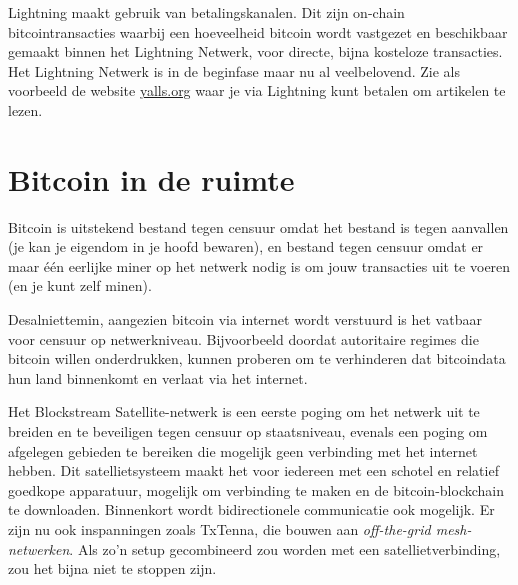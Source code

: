 Lightning maakt gebruik van betalingskanalen. Dit zijn on-chain bitcointransacties waarbij een hoeveelheid bitcoin wordt vastgezet en beschikbaar gemaakt binnen het Lightning Netwerk, voor directe, bijna kosteloze transacties. Het Lightning Netwerk is in de beginfase maar nu al veelbelovend. Zie als voorbeeld de website \href{https://yalls.org}{yalls.org} waar je via Lightning kunt betalen om artikelen te lezen.  

\section{Bitcoin in de ruimte}

Bitcoin is uitstekend bestand tegen censuur omdat het bestand is tegen aanvallen (je kan je eigendom in je hoofd bewaren), en bestand tegen censuur omdat er maar één eerlijke miner op het netwerk nodig is om jouw transacties uit te voeren (en je kunt zelf minen). 

Desalniettemin, aangezien bitcoin via internet wordt verstuurd is het vatbaar voor censuur op netwerkniveau. Bijvoorbeeld doordat autoritaire regimes die bitcoin willen onderdrukken, kunnen proberen om te verhinderen dat bitcoindata hun land binnenkomt en verlaat via het internet.

Het Blockstream Satellite-netwerk is een eerste poging om het netwerk uit te breiden en te beveiligen tegen censuur op staatsniveau, evenals een poging om afgelegen gebieden te bereiken die mogelijk geen verbinding met het internet hebben. Dit satellietsysteem maakt het voor iedereen met een schotel en relatief goedkope apparatuur, mogelijk om verbinding te maken en de bitcoin-blockchain te downloaden. Binnenkort wordt bidirectionele communicatie ook mogelijk. Er zijn nu ook inspanningen zoals TxTenna, die bouwen aan \textit{off-the-grid mesh-netwerken}. Als zo'n setup gecombineerd zou worden met een satellietverbinding, zou het bijna niet te stoppen zijn.

\backmatter
